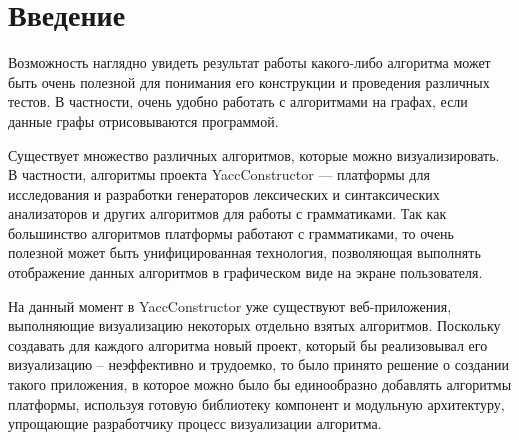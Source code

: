 \documentclass[14pt]{matmex-diploma}
\begin{document}
\maketitle
\tableofcontents
\section*{Введение}
Возможность наглядно увидеть результат работы какого-либо алгоритма может быть очень полезной для понимания его конструкции и проведения различных тестов. В частности, очень удобно работать с алгоритмами на графах, если данные графы отрисовываются программой. 

Существует множество различных алгоритмов, которые можно визуализировать. В частности, алгоритмы проекта YaccConstructor — платформы для исследования и разработки генераторов лексических и синтаксических анализаторов и других алгоритмов для работы с грамматиками. Так как большинство алгоритмов платформы работают с грамматиками, то очень полезной может быть унифицированная технология, позволяющая выполнять отображение данных алгоритмов в графическом виде на экране пользователя. 

На данный момент в YaccConstructor уже существуют веб-приложения, выполняющие визуализацию некоторых отдельно взятых алгоритмов. Поскольку создавать для каждого алгоритма новый проект, который бы реализовывал его визуализацию -- неэффективно и трудоемко, то было принято решение о создании такого приложения, в которое можно было бы единообразно добавлять алгоритмы платформы, используя готовую библиотеку компонент и модульную архитектуру, упрощающие разработчику процесс визуализации алгоритма. 
\end{document}
